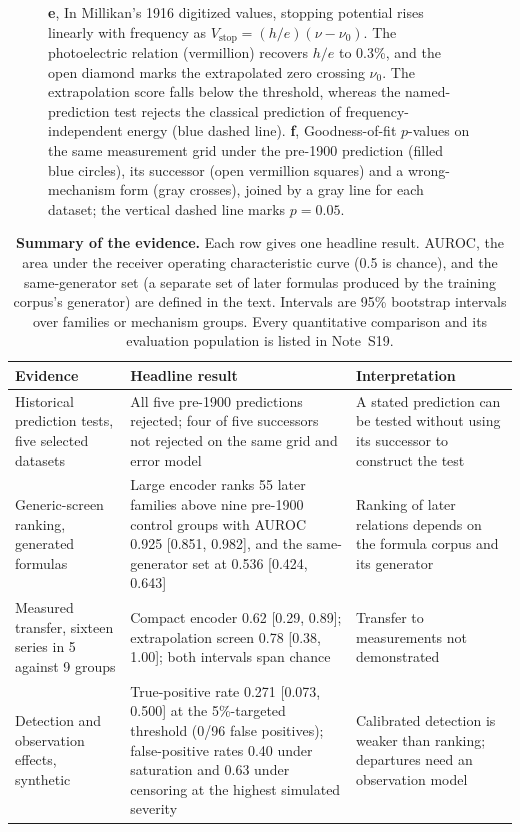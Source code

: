 \documentclass{article}
\begin{document}
\begin{figure}[p]
{  \textbf{e}, In Millikan's 1916 digitized values, stopping potential rises
  linearly with frequency as $V_{\mathrm{stop}} = (h/e)(\nu - \nu_{0})$. The photoelectric relation (vermillion) recovers $h/e$ to 0.3\%, and the open diamond marks the extrapolated zero crossing $\nu_{0}$. The extrapolation score falls below the threshold, whereas the
  named-prediction test rejects the classical prediction of frequency-independent energy (blue dashed line). \textbf{f}, Goodness-of-fit $p$-values on the same measurement grid under the pre-1900 prediction (filled blue circles), its successor (open vermillion squares) and a wrong-mechanism form (gray crosses), joined by a gray line for each dataset; the vertical dashed line marks $p = 0.05$.}
  \label{fig:cases}
\end{figure}

\begin{table}[t]
\centering
\caption{\textbf{Summary of the evidence.} Each row gives one headline result. AUROC, the area under the receiver operating characteristic curve (0.5 is chance), and the same-generator set (a separate set of later formulas produced by the training corpus's generator) are defined in the text. Intervals are 95\% bootstrap intervals over families or mechanism groups. Every quantitative comparison and its evaluation population is listed in Note~S19.}
\label{tab:evidence}
\small
\renewcommand{\arraystretch}{1.15}
\begin{tabular}{@{}>{\raggedright\arraybackslash}p{}
                  >{\raggedright\arraybackslash}p{}
                  >{\raggedright\arraybackslash}p{}@{}}
\toprule
Evidence & Headline result & Interpretation \\
\midrule
Historical prediction tests, five selected datasets &
All five pre-1900 predictions rejected; four of five successors not rejected on the same grid and error model &
A stated prediction can be tested without using its successor to construct the test \\
Generic-screen ranking, generated formulas &
Large encoder ranks 55 later families above nine pre-1900 control groups with AUROC 0.925 [0.851, 0.982], and the same-generator set at 0.536 [0.424, 0.643] &
Ranking of later relations depends on the formula corpus and its generator \\
Measured transfer, sixteen series in 5 against 9 groups &
Compact encoder 0.62 [0.29, 0.89]; extrapolation screen 0.78 [0.38, 1.00]; both intervals span chance &
Transfer to measurements not demonstrated \\
Detection and observation effects, synthetic &
True-positive rate 0.271 [0.073, 0.500] at the 5\%-targeted threshold (0/96 false positives); false-positive rates 0.40 under saturation and 0.63 under censoring at the highest simulated severity &
Calibrated detection is weaker than ranking; departures need an observation model \\
\bottomrule
\end{tabular}
\end{table}
\end{document}
